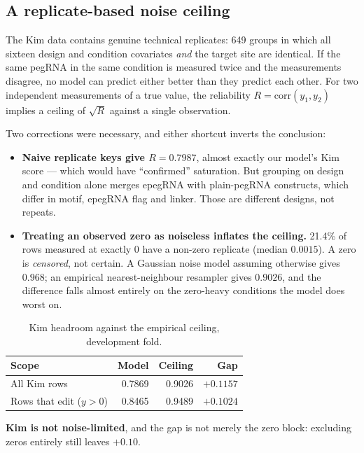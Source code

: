 \documentclass[11pt]{article}
\begin{document}
\subsection{A replicate-based noise ceiling}

The Kim data contains genuine technical replicates: 649 groups in which all sixteen
design and condition covariates \emph{and} the target site are identical. If the same
pegRNA in the same condition is measured twice and the measurements disagree, no model
can predict either better than they predict each other. For two independent
measurements of a true value, the reliability $R = \mathrm{corr}(y_1,y_2)$ implies a
ceiling of $\sqrt{R}$ against a single observation.

Two corrections were necessary, and either shortcut inverts the conclusion:

\begin{itemize}
\item \textbf{Naive replicate keys give $R=0.7987$}, almost exactly our model's Kim
score --- which would have ``confirmed'' saturation. But grouping on design and
condition alone merges epegRNA with plain-pegRNA constructs, which differ in motif,
epegRNA flag and linker. Those are different designs, not repeats.
\item \textbf{Treating an observed zero as noiseless inflates the ceiling.} 21.4\% of
rows measured at exactly $0$ have a non-zero replicate (median $0.0015$). A zero is
\emph{censored}, not certain. A Gaussian noise model assuming otherwise gives $0.968$;
an empirical nearest-neighbour resampler gives $0.9026$, and the difference falls
almost entirely on the zero-heavy conditions the model does worst on.
\end{itemize}

\begin{table}[H]
\centering
\caption{Kim headroom against the empirical ceiling, development fold.}
\label{tab:ceiling}
\begin{tabular}{lrrr}
\toprule
Scope & Model & Ceiling & Gap \\
\midrule
All Kim rows & 0.7869 & 0.9026 & $\mathbf{+0.1157}$ \\
Rows that edit ($y>0$) & 0.8465 & 0.9489 & $+0.1024$ \\
\bottomrule
\end{tabular}
\end{table}

\textbf{Kim is not noise-limited}, and the gap is not merely the zero block: excluding
zeros entirely still leaves $+0.10$.
\end{document}
